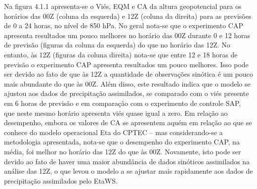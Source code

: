 Na figura 4.1.1 apresenta-se o Viés, EQM e CA da altura geopotencial para os horários das 00Z (coluna da esquerda) e 12Z (coluna da direita) para as previsões de 0 a 24 horas, no nível de 850 hPa. No geral nota-se que o experimento CAP apresenta resultados um pouco melhores no horário das 00Z durante 0 e 12 horas de previsão (figuras da coluna da esquerda) do que no horário das 12Z. No entanto, às 12Z (figuras da coluna direita) nota-se que entre 12 e 18 horas de previsão o experimento CAP apresenta resultados um pouco melhores. Isso pode ser devido ao fato de que às 12Z a quantidade de observações sinótica é um pouco mais abundante do que às 00Z. Além disso, este resultado indica que o modelo se ajustou aos dados de precipitação assimilados, se comparado com o viés presente em 6 horas de previsão e em comparação com o experimento de controle SAP, que neste mesmo horário apresenta viés quase igual a zero. Em relação ao desempenho, embora os valores de CA se apresentem aquém em relação ao que se conhece do modelo operacional Eta do CPTEC – mas considerando-se a metodologia apresentada, nota-se que o desempenho do experimento CAP, na média, foi melhor no horário das 12Z do que às 00Z. Novamente, isto pode ser devido ao fato de haver uma maior abundância de dados sinóticos assimilados na análise das 12Z, o que levou o modelo a se ajustar mais rapidamente aos dados de precipitação assimilados pelo EtaWS.

